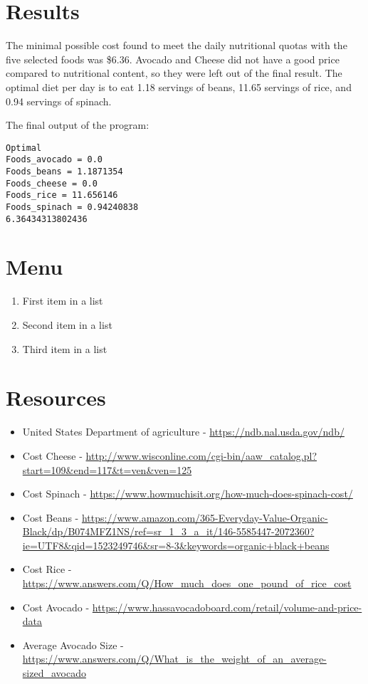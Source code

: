 \documentclass[paper=a4, fontsize=11pt]{scrartcl}
\numberwithin{equation}{section}		%
\numberwithin{figure}{section}			%
\numberwithin{table}{section}				%
\begin{document}
\section{Results}
The minimal possible cost found to meet the daily nutritional quotas with the five selected foods was \$6.36. Avocado and Cheese did not have a good price compared to nutritional content, so they were left out of the final result. The optimal diet per day is to eat 1.18 servings of beans, 11.65 servings of rice, and 0.94 servings of spinach.

The final output of the program:

\begin{lstlisting}
Optimal
Foods_avocado = 0.0
Foods_beans = 1.1871354
Foods_cheese = 0.0
Foods_rice = 11.656146
Foods_spinach = 0.94240838
6.36434313802436
\end{lstlisting}

\section{Menu}




\begin{enumerate}
	\item First item in a list 
	\item Second item in a list 
	\item Third item in a list
\end{enumerate}

\section{Resources}

\begin{itemize}
\item United States Department of agriculture - \url{https://ndb.nal.usda.gov/ndb/}
\item Cost Cheese - \url{http://www.wisconline.com/cgi-bin/aaw_catalog.pl?start=109&end=117&t=ven&ven=125}
\item Cost Spinach - \url{https://www.howmuchisit.org/how-much-does-spinach-cost/}
\item Cost Beans - \url{https://www.amazon.com/365-Everyday-Value-Organic-Black/dp/B074MFZ1NS/ref=sr_1_3_a_it/146-5585447-2072360?ie=UTF8&qid=1523249746&sr=8-3&keywords=organic+black+beans}
\item Cost Rice - \url{https://www.answers.com/Q/How_much_does_one_pound_of_rice_cost}
\item Cost Avocado - \url{https://www.hassavocadoboard.com/retail/volume-and-price-data}
\item Average Avocado Size - \url{https://www.answers.com/Q/What_is_the_weight_of_an_average-sized_avocado}
  
\end{itemize}
\end{document}
